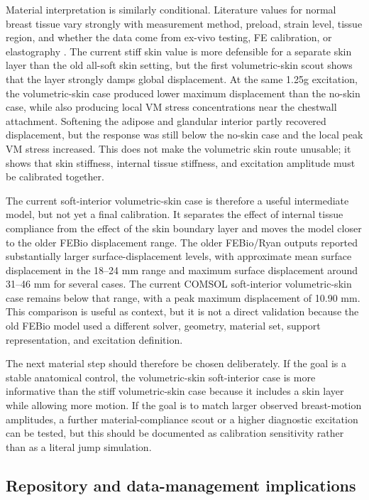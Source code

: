 Material interpretation is similarly conditional. Literature values for normal breast tissue vary strongly with measurement method, preload, strain level, tissue region, and whether the data come from ex-vivo testing, FE calibration, or elastography \cite{Samani2007,Ramiao2016,Goodbrake2022,Teixeira2023,Patel2021}. The current stiff skin value is more defensible for a separate skin layer than the old all-soft skin setting, but the first volumetric-skin scout shows that the layer strongly damps global displacement. At the same 1.25g excitation, the volumetric-skin case produced lower maximum displacement than the no-skin case, while also producing local VM stress concentrations near the chestwall attachment. Softening the adipose and glandular interior partly recovered displacement, but the response was still below the no-skin case and the local peak VM stress increased. This does not make the volumetric skin route unusable; it shows that skin stiffness, internal tissue stiffness, and excitation amplitude must be calibrated together.

The current soft-interior volumetric-skin case is therefore a useful intermediate model, but not yet a final calibration. It separates the effect of internal tissue compliance from the effect of the skin boundary layer and moves the model closer to the older FEBio displacement range. The older FEBio/Ryan outputs reported substantially larger surface-displacement levels, with approximate mean surface displacement in the 18--24 mm range and maximum surface displacement around 31--46 mm for several cases. The current COMSOL soft-interior volumetric-skin case remains below that range, with a peak maximum displacement of 10.90 mm. This comparison is useful as context, but it is not a direct validation because the old FEBio model used a different solver, geometry, material set, support representation, and excitation definition.

The next material step should therefore be chosen deliberately. If the goal is a stable anatomical control, the volumetric-skin soft-interior case is more informative than the stiff volumetric-skin case because it includes a skin layer while allowing more motion. If the goal is to match larger observed breast-motion amplitudes, a further material-compliance scout or a higher diagnostic excitation can be tested, but this should be documented as calibration sensitivity rather than as a literal jump simulation.

\subsection{Repository and data-management implications}


